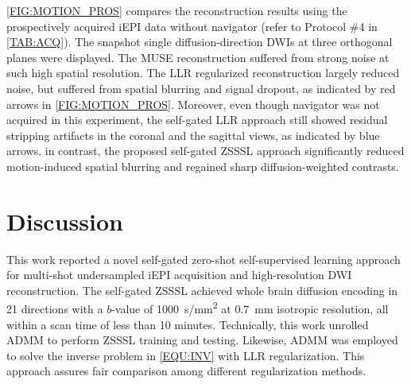 \documentclass[journal,twoside,web]{ieeecolor}
\begin{document}
	\cref{FIG:MOTION_PROS} compares the reconstruction results
	using the prospectively acquired iEPI data without navigator
	(refer to Protocol \#4 in \cref{TAB:ACQ}).
	The snapshot single diffusion-direction DWIs at three orthogonal planes were displayed.
	The MUSE reconstruction suffered from strong noise at such high spatial resolution.
	The LLR regularized reconstruction largely reduced noise,
	but suffered from spatial blurring and signal dropout,
	as indicated by red arrows in \cref{FIG:MOTION_PROS}.
	Moreover, even though navigator was not acquired in this experiment,
	the self-gated LLR approach still showed residual stripping artifacts
	in the coronal and the sagittal views, as indicated by blue arrows.
	in contrast, the proposed self-gated ZSSSL approach significantly
	reduced motion-induced spatial blurring and regained sharp diffusion-weighted contrasts.


	\section{Discussion}

	This work reported a novel self-gated zero-shot self-supervised learning approach
	for multi-shot undersampled iEPI acquisition and high-resolution DWI reconstruction.
	The self-gated ZSSSL achieved whole brain diffusion encoding in 21 directions
	with a $b$-value of \SI{1000}{s/mm^2}
	at \SI{0.7}{mm} isotropic resolution,
	all within a scan time of less than 10 minutes.
	Technically, this work unrolled ADMM to perform ZSSSL training and testing.
	Likewise, ADMM was employed to solve the inverse problem in \cref{EQU:INV}
	with LLR regularization.
	This approach assures fair comparison among different regularization methods.

\end{document}
